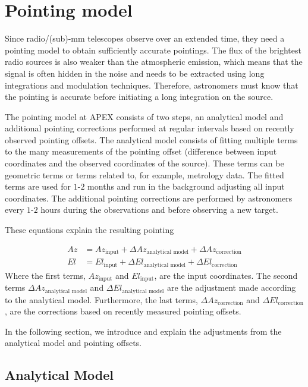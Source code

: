 \section{Pointing model}\label{sec:pt_model}
Since radio/(sub)-mm telescopes observe over an extended time, they need a pointing model to obtain sufficiently accurate pointings.
The flux of the brightest radio sources is also weaker than the atmospheric emission,
which means that the signal is often hidden in the noise and needs to be extracted using long integrations and modulation techniques.
Therefore, astronomers must know that the pointing is accurate before initiating a long integration on the source.

The pointing model at APEX consists of two steps, an analytical model and additional pointing corrections performed at regular intervals based on recently observed pointing offsets.
The analytical model consists of fitting multiple terms to the many measurements of the pointing offset (difference between input coordinates and the observed coordinates of the source).
These terms can be geometric terms or terms related to, for example, metrology data.
The fitted terms are used for $1$-$2$ months and run in the background adjusting all input coordinates.
The additional pointing corrections are performed by astronomers every $1$-$2$ hours during the observations and before observing a new target.

These equations explain the resulting pointing

\begin{align}
    Az &= Az_\text{input} + \Delta Az_\text{analytical model} + \Delta Az_\text{correction} \\ 
    El &= El_\text{input} + \Delta El_\text{analytical model} + \Delta El_\text{correction}
\end{align}
Where the first terms, $Az_\text{input}$ and $El_\text{input}$, are the input coordinates.
The second terms $\Delta Az_\text{analytical model}$ and $\Delta El_\text{analytical model}$ are the adjustment made according to the analytical model.
Furthermore, the last terms, $\Delta Az_\text{correction}$ and $\Delta El_\text{correction}$, are the corrections based on recently measured pointing offsets.

In the following section, we introduce and explain the adjustments from the analytical model and pointing offsets. 


\subsection{Analytical Model}


